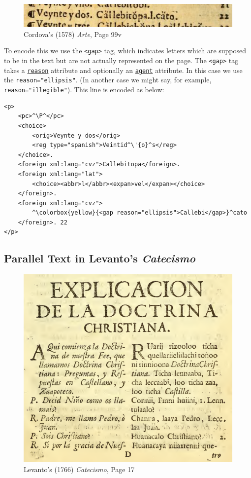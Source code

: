 \documentclass[12pt,a4paper]{article}
\begin{document}
\begin{figure}[h]
\centerline{\includegraphics[scale=0.70]{Arte_Page99v} }
\caption{Cordova's (1578) \emph{Arte}, Page 99v}
\end{figure}

To encode this we use the \hyperref[tag-sec:gap]{\texttt{<gap>}} tag, which indicates letters which are supposed to be in the text but are not actually represented on the page.  The \texttt{<gap>} tag takes a \hyperref[att-sec:reason]{\texttt{reason}} attribute and optionally an \hyperref[att-sec:agent]{\texttt{agent}} attribute.  In this case we use the \texttt{reason="ellipsis"}.  (In another case we might say, for example, \texttt{reason="illegible"}).  This line is encoded as below:

\begin{lstlisting}
<p>
	<pc>^\P^</pc>
	<choice>
		<orig>Veynte y dos</orig>
		<reg type="spanish">Veintid^\'{o}^s</reg>
	</choice>.
	<foreign xml:lang="cvz">Callebitopa</foreign>. 
	<foreign xml:lang="lat">
		<choice><abbr>l</abbr><expan>vel</expan></choice>
	</foreign>. 
	<foreign xml:lang="cvz">
		^\colorbox{yellow}{<gap reason="ellipsis">Callebi</gap>}^cato
	</foreign>. 22
</p>
\end{lstlisting}

\subsection{Parallel Text in Levanto's \emph{Catecismo}}

\begin{figure}[h]
\centerline{\includegraphics[scale=0.55]{Levanto1766_Page17} }
\caption{Levanto's (1766) \emph{Catecismo}, Page 17}
\end{figure}
\end{document}

